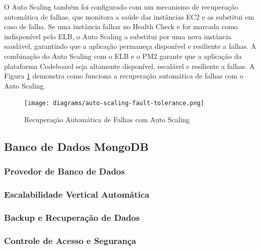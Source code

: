 O Auto Scaling também foi configurado com um mecanismo de recuperação automática de falhas, que monitora a saúde das instâncias EC2 e as substitui em caso de falha. Se uma instância falhar no Health Check e for marcada como indisponível pelo ELB, o Auto Scaling a substitui por uma nova instância saudável, garantindo que a aplicação permaneça disponível e resiliente a falhas. A combinação do Auto Scaling com o ELB e o PM2 garante que a aplicação da plataforma Codeboard seja altamente disponível, escalável e resiliente a falhas. A Figura \ref{fig:auto-scaling-fault-tolerance} demonstra como funciona a recuperação automática de falhas com o Auto Scaling.

\begin{figure}[H]
    \centering
    \texttt{[image: diagrams/auto-scaling-fault-tolerance.png]}
    \caption{Recuperação Automática de Falhas com Auto Scaling}
    \label{fig:auto-scaling-fault-tolerance}
\end{figure}

\subsection{Banco de Dados MongoDB}

\subsubsection{Provedor de Banco de Dados}

\subsubsection{Escalabilidade Vertical Automática}

\subsubsection{Backup e Recuperação de Dados}

\subsubsection{Controle de Acesso e Segurança}

